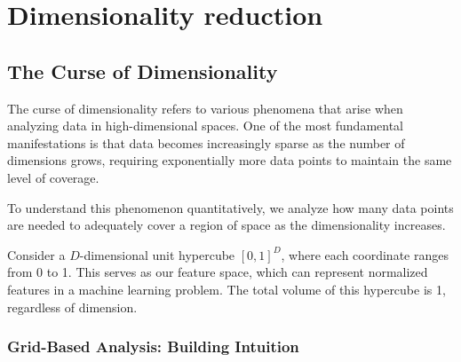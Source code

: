 \chapter{Dimensionality reduction}
\section*{The Curse of Dimensionality}


The curse of dimensionality refers to various phenomena that arise when analyzing data in high-dimensional spaces. One of the most fundamental manifestations is that data becomes increasingly sparse as the number of dimensions grows, requiring exponentially more data points to maintain the same level of coverage.

To understand this phenomenon quantitatively, we analyze how many data points are needed to adequately cover a region of space as the dimensionality increases.

Consider a $D$-dimensional unit hypercube $[0,1]^D$, where each coordinate ranges from 0 to 1. This serves as our feature space, which can represent normalized features in a machine learning problem. The total volume of this hypercube is 1, regardless of dimension.

\subsection*{Grid-Based Analysis: Building Intuition}


